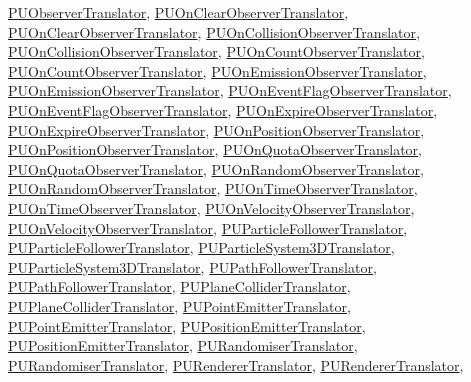 \hyperlink{classPUObserverTranslator}{P\+U\+Observer\+Translator}, \hyperlink{classPUOnClearObserverTranslator}{P\+U\+On\+Clear\+Observer\+Translator}, \hyperlink{classPUOnClearObserverTranslator}{P\+U\+On\+Clear\+Observer\+Translator}, \hyperlink{classPUOnCollisionObserverTranslator}{P\+U\+On\+Collision\+Observer\+Translator}, \hyperlink{classPUOnCollisionObserverTranslator}{P\+U\+On\+Collision\+Observer\+Translator}, \hyperlink{classPUOnCountObserverTranslator}{P\+U\+On\+Count\+Observer\+Translator}, \hyperlink{classPUOnCountObserverTranslator}{P\+U\+On\+Count\+Observer\+Translator}, \hyperlink{classPUOnEmissionObserverTranslator}{P\+U\+On\+Emission\+Observer\+Translator}, \hyperlink{classPUOnEmissionObserverTranslator}{P\+U\+On\+Emission\+Observer\+Translator}, \hyperlink{classPUOnEventFlagObserverTranslator}{P\+U\+On\+Event\+Flag\+Observer\+Translator}, \hyperlink{classPUOnEventFlagObserverTranslator}{P\+U\+On\+Event\+Flag\+Observer\+Translator}, \hyperlink{classPUOnExpireObserverTranslator}{P\+U\+On\+Expire\+Observer\+Translator}, \hyperlink{classPUOnExpireObserverTranslator}{P\+U\+On\+Expire\+Observer\+Translator}, \hyperlink{classPUOnPositionObserverTranslator}{P\+U\+On\+Position\+Observer\+Translator}, \hyperlink{classPUOnPositionObserverTranslator}{P\+U\+On\+Position\+Observer\+Translator}, \hyperlink{classPUOnQuotaObserverTranslator}{P\+U\+On\+Quota\+Observer\+Translator}, \hyperlink{classPUOnQuotaObserverTranslator}{P\+U\+On\+Quota\+Observer\+Translator}, \hyperlink{classPUOnRandomObserverTranslator}{P\+U\+On\+Random\+Observer\+Translator}, \hyperlink{classPUOnRandomObserverTranslator}{P\+U\+On\+Random\+Observer\+Translator}, \hyperlink{classPUOnTimeObserverTranslator}{P\+U\+On\+Time\+Observer\+Translator}, \hyperlink{classPUOnTimeObserverTranslator}{P\+U\+On\+Time\+Observer\+Translator}, \hyperlink{classPUOnVelocityObserverTranslator}{P\+U\+On\+Velocity\+Observer\+Translator}, \hyperlink{classPUOnVelocityObserverTranslator}{P\+U\+On\+Velocity\+Observer\+Translator}, \hyperlink{classPUParticleFollowerTranslator}{P\+U\+Particle\+Follower\+Translator}, \hyperlink{classPUParticleFollowerTranslator}{P\+U\+Particle\+Follower\+Translator}, \hyperlink{classPUParticleSystem3DTranslator}{P\+U\+Particle\+System3\+D\+Translator}, \hyperlink{classPUParticleSystem3DTranslator}{P\+U\+Particle\+System3\+D\+Translator}, \hyperlink{classPUPathFollowerTranslator}{P\+U\+Path\+Follower\+Translator}, \hyperlink{classPUPathFollowerTranslator}{P\+U\+Path\+Follower\+Translator}, \hyperlink{classPUPlaneColliderTranslator}{P\+U\+Plane\+Collider\+Translator}, \hyperlink{classPUPlaneColliderTranslator}{P\+U\+Plane\+Collider\+Translator}, \hyperlink{classPUPointEmitterTranslator}{P\+U\+Point\+Emitter\+Translator}, \hyperlink{classPUPointEmitterTranslator}{P\+U\+Point\+Emitter\+Translator}, \hyperlink{classPUPositionEmitterTranslator}{P\+U\+Position\+Emitter\+Translator}, \hyperlink{classPUPositionEmitterTranslator}{P\+U\+Position\+Emitter\+Translator}, \hyperlink{classPURandomiserTranslator}{P\+U\+Randomiser\+Translator}, \hyperlink{classPURandomiserTranslator}{P\+U\+Randomiser\+Translator}, \hyperlink{classPURendererTranslator}{P\+U\+Renderer\+Translator}, \hyperlink{classPURendererTranslator}{P\+U\+Renderer\+Translator}, 